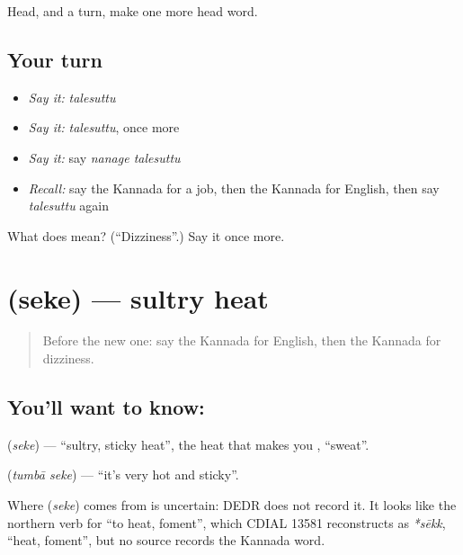 \begin{grammarlens}[title={What you've built}]
Head, and a turn, make one more head word.
\end{grammarlens}

\subsection*{Your turn}
\begin{itemize}
\raggedright
  \item \emph{Say it:} \emph{talesuttu}
  \item \emph{Say it:} \emph{talesuttu}, once more
  \item \emph{Say it:} say \emph{nanage talesuttu}
  \item \emph{Recall:} say the Kannada for a job, then the Kannada for English, then say \emph{talesuttu} again
\end{itemize}

\begin{tcolorbox}[breakable,colback=teal!4,colframe=teal!35!black,title={Before you move on}]
What does  mean? (\textquotedblleft{}Dizziness\textquotedblright{}.) Say it once more.
\end{tcolorbox}
\section[\texorpdfstring{\kn{ಸೆಕೆ} (seke)}{ಸೆಕೆ (seke)}]{ (seke) — sultry heat}

\label{lesson:KA-C93-sultry}



\begin{quote}
Before the new one: say the Kannada for English, then the Kannada for dizziness.
\end{quote}

\subsection*{You'll want to know: }
\textbf{} (\emph{seke}) — \textquotedblleft{}sultry, sticky heat\textquotedblright{}, the heat that makes you \textbf{}, \textquotedblleft{}sweat\textquotedblright{}.

\textbf{ } (\emph{tumbā seke}) — \textquotedblleft{}it's very hot and sticky\textquotedblright{}.

\begin{cousinweb}
Where \textbf{} (\emph{seke}) comes from is uncertain: DEDR does not record it. It looks like the northern verb for \textquotedblleft{}to heat, foment\textquotedblright{}, which CDIAL 13581 reconstructs as \emph{*sēkk}, \textquotedblleft{}heat, foment\textquotedblright{}, but no source records the Kannada word.
\end{cousinweb}

